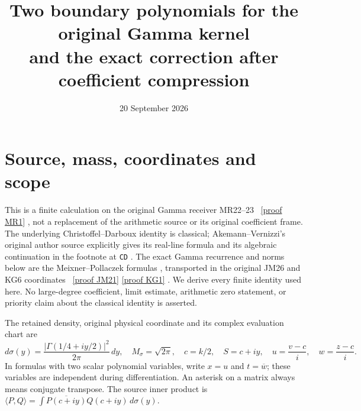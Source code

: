 \documentclass[11pt]{article}
\title{Two boundary polynomials for the original Gamma kernel\\and the exact correction after coefficient compression}
\author{}
\date{20 September 2026}
\begin{document}
\maketitle

\section{Source, mass, coordinates and scope}

This is a finite calculation on the original Gamma receiver MR22--23
\cite{MR}%
~\href{https://github.com/KokunoYumeto/zeta-function-research-reader/blob/5992ad50c0f2a06921f1fcaded7b4e38097c0739/workbenches/splitzero-tandem/continuations/20260920-original-kernel-mixed-determinants/ORIGINAL_KERNEL_MIXED_DETERMINANT.tex\#L36}{[proof MR1]}%
{}, not a replacement of the arithmetic source or its original
coefficient frame. The underlying Christoffel--Darboux identity is
classical; Akemann--Vernizzi's original author source explicitly gives
its real-line formula and its algebraic continuation in the footnote
at \texttt{CD} \cite{AV}. The exact Gamma recurrence and norms below
are the Meixner--Pollaczek formulas \cite{DLMF}, transported in the
original JM26 and KG6 coordinates \cite{JM,KG}%
~\href{https://github.com/KokunoYumeto/zeta-function-research-reader/blob/5992ad50c0f2a06921f1fcaded7b4e38097c0739/workbenches/splitzero-tandem/continuations/20260920-original-kernel-mixed-determinants/providers/JOINT_MINIMUM_RECEIVERS.tex\#L286}{[proof JM21]} \href{https://github.com/KokunoYumeto/zeta-function-research-reader/blob/5992ad50c0f2a06921f1fcaded7b4e38097c0739/workbenches/splitzero-tandem/continuations/20260920-original-kernel-mixed-determinants/providers/KERNEL_GAMMA_INDEPENDENT.tex\#L73}{[proof KG1]}%
{}. We derive every finite
identity used here. No large-degree coefficient, limit estimate,
arithmetic zero statement, or priority claim about the classical
identity is asserted.

The retained density, original physical coordinate and its complex
evaluation chart are
\begin{equation}\label{eq:source}
 d\sigma(y)=\frac{|\Gamma(1/4+iy/2)|^2}{2\pi}\,dy,
 \quad M_\sigma=\sqrt{2\pi},\quad c=k/2,
 \quad S=c+iy,
 \quad u=\frac{v-c}{i},\quad w=\frac{z-c}{i}.
 \tag{CD1}
\end{equation}
In formulas with two scalar polynomial variables, write \(x=u\) and
\(t=\overline w\); these variables are independent during
differentiation. An asterisk on a matrix always means conjugate
transpose. The source inner product is
\(\langle P,Q\rangle=\int\overline{P(c+iy)}Q(c+iy)\,d\sigma(y)\).
\end{document}
